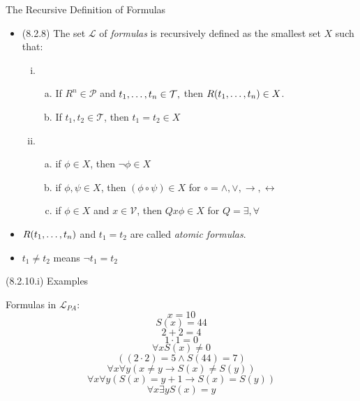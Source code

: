 \begin{frame}{The Recursive Definition of Formulas}

	\begin{itemize}
	
		\item (8.2.8) The set $\mathcal{L}$ of \emph{formulas} is recursively defined as the smallest set $X$ such that:
		\begin{enumerate}[(i)]
		
			\item \begin{enumerate}[(a)]
			
				\item If $R^n\in\mathcal{P}$ and $t_1, \mathellipsis, t_n\in \mathcal{T},$ then $R(t_1, \mathellipsis, t_n)\in X$.
				
				\item If $t_1,t_2\in \mathcal{T}$, then $t_1=t_2\in X$
				
				\end{enumerate}
			
			\item \begin{enumerate}[(a)]
			
				\item if $\phi\in X$, then $\neg \phi\in X$
				
				\item if $\phi,\psi\in X$, then $(\phi\circ\psi)\in X$ for $\circ=\land,\lor,\to,\leftrightarrow$
				
				\item if $\phi\in X$ and $x\in \mathcal{V}$, then $Qx\phi\in X$ for $Q=\exists,\forall$
			
			\end{enumerate}
							
		\end{enumerate}
		
		\item $R(t_1, \mathellipsis, t_n)$ and $t_1=t_2$ are called \emph{atomic formulas}.
		
		\item $t_1\neq t_2$ means $\neg{t_1=t_2}$

	
	\end{itemize}

\end{frame}

\begin{frame}{(8.2.10.i) Examples}

Formulas in $\mathcal{L}_{PA}$:
					\[x=10\]
					\[S(x)=44\]
					\[2+2=4\]
					\[1\cdot1=0\]
					\[\forall x S(x)\neq 0\]
					\[((2\cdot 2)=5\land S(44)=7)\]
					\[\forall x\forall y(x\neq y\to S(x)\neq S(y))\]
					\[\forall x\forall y(S(x)=y+1\to S(x)=S(y))\]
					\[\forall x\exists yS(x)=y\]


\end{frame}

